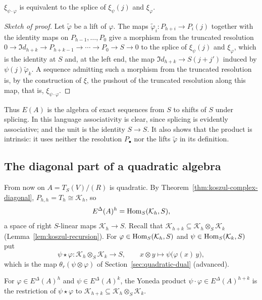 \begin{advanced}
\begin{proposition}\label{prop:yoneda-splicing}
$\xi_{\psi\cdot\varphi}$ is equivalent to the splice of $\xi_\psi(j)$ and $\xi_\varphi$.
\end{proposition}

\begin{proof}[Sketch of proof]
Let $\tilde\varphi$ be a lift of $\varphi$.
The maps $\tilde\varphi_i:P_{h+i}\to P_i(j)$ together with the identity maps on $P_{h-1},\ldots,P_0$ give a morphism from the truncated resolution
$0\to\Im d_{h+k}\to P_{h+k-1}\to\cdots\to P_0\to S\to0$
to the splice of $\xi_\psi(j)$ and $\xi_\varphi$, which is the identity at $S$ and, at the left end, the map $\Im d_{h+k}\to S(j+j')$ induced by $\psi(j)\tilde\varphi_k$.
A sequence admitting such a morphism from the truncated resolution is, by the construction of $\xi$, the pushout of the truncated resolution along this map, that is, $\xi_{\psi\cdot\varphi}$.
\end{proof}

Thus $E(A)$ is the algebra of exact sequences from $S$ to shifts of $S$ under splicing.
In this language associativity is clear, since splicing is evidently associative; and the unit is the identity $S\to S$.
It also shows that the product is intrinsic: it uses neither the resolution $P_\bullet$ nor the lifts $\tilde\varphi$ in its definition.
\end{advanced}

\subsection{The diagonal part of a quadratic algebra}

From now on $A=T_S(V)/(R)$ is quadratic.
By Theorem~\ref{thm:koszul-complex-diagonal}, $P_{h,h}=T_h\cong\mathcal K_h$, so
\[
E^\Delta(A)^h=\operatorname{Hom}\nolimits_S(\mathcal K_h,S),
\]
a space of right $S$-linear maps $\mathcal K_h\to S$.
Recall that $\mathcal K_{h+k}\subseteq\mathcal K_h\otimes_S\mathcal K_k$ (Lemma~\ref{lem:koszul-recursion}).
For $\varphi\in\operatorname{Hom}\nolimits_S(\mathcal K_h,S)$ and $\psi\in\operatorname{Hom}\nolimits_S(\mathcal K_k,S)$ put
\[
\psi\star\varphi:\mathcal K_h\otimes_S\mathcal K_k\to S,\qquad x\otimes y\longmapsto\psi\bigl(\varphi(x)\,y\bigr),
\]
which is the map $\theta_r(\psi\otimes\varphi)$ of Section~\ref{sec:quadratic-dual} (advanced).

\begin{proposition}\label{prop:diagonal-product}
For $\varphi\in E^\Delta(A)^h$ and $\psi\in E^\Delta(A)^k$, the Yoneda product $\psi\cdot\varphi\in E^\Delta(A)^{h+k}$ is the restriction of $\psi\star\varphi$ to $\mathcal K_{h+k}\subseteq\mathcal K_h\otimes_S\mathcal K_k$.
\end{proposition}

